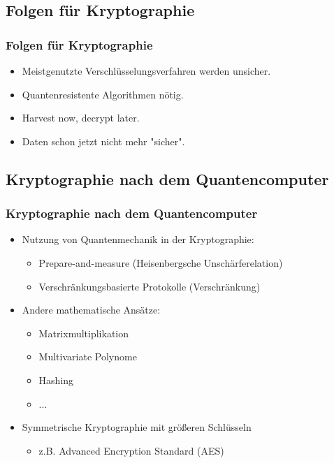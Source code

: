 \documentclass{beamer}
\begin{document}
\subsection{Folgen für Kryptographie}
\begin{frame}
\frametitle{Folgen für Kryptographie}

\begin{itemize}
    \item Meistgenutzte Verschlüsselungsverfahren werden unsicher.
    \item Quantenresistente Algorithmen nötig.
    \item Harvest now, decrypt later.
    \item Daten schon jetzt nicht mehr "sicher".
\end{itemize}
\end{frame}

\subsection{Kryptographie nach dem Quantencomputer}
\begin{frame}
\frametitle{Kryptographie nach dem Quantencomputer}

\begin{itemize}
    \item Nutzung von Quantenmechanik in der Kryptographie:
    \begin{itemize}
        \item Prepare-and-measure (Heisenbergsche Unschärferelation)
        \item Verschränkungsbasierte Protokolle (Verschränkung)
    \end{itemize}
    \item Andere mathematische Ansätze:
    \begin{itemize}
        \item Matrixmultiplikation
        \item Multivariate Polynome
        \item Hashing
        \item ...
    \end{itemize}
    \item Symmetrische Kryptographie mit größeren Schlüsseln
    \begin{itemize}
        \item z.B. Advanced Encryption Standard (AES)
    \end{itemize}
\end{itemize}

\end{frame}
\end{document}

